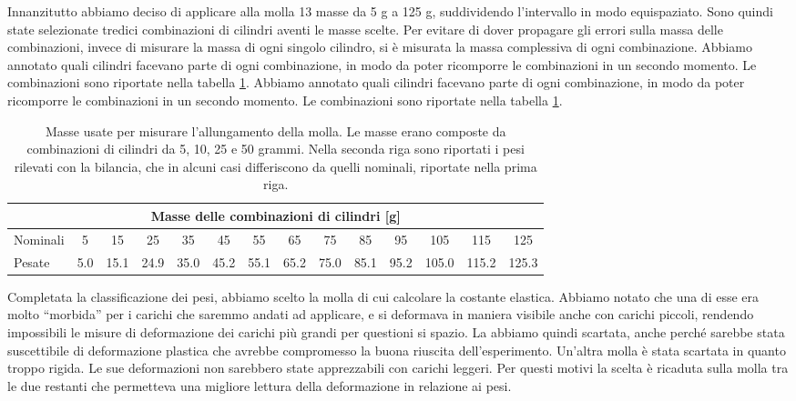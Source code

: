 Innanzitutto abbiamo deciso di applicare alla molla 13 masse da 5 g a 125 g, suddividendo l'intervallo in modo equispaziato.
Sono quindi state selezionate tredici combinazioni di cilindri aventi le masse scelte. Per evitare di dover propagare gli errori sulla massa delle combinazioni, invece di misurare la massa di ogni singolo cilindro, si è misurata la massa complessiva di ogni combinazione. Abbiamo annotato quali cilindri facevano parte di ogni combinazione, in modo da poter ricomporre le combinazioni in un secondo momento. Le combinazioni sono riportate nella tabella \ref{tab:masse}.
Abbiamo annotato quali cilindri facevano parte di ogni combinazione, in modo da poter ricomporre le combinazioni in un secondo momento. Le combinazioni sono riportate nella tabella \ref{tab:masse}.

\begin{table}[tb]
    \centering
    \small
    \begin{tabular}{l | c c c c c c c c c c c c c}
        \multicolumn{14}{c}{Masse delle combinazioni di cilindri [g]} \\[1mm]
        \toprule
        Nominali & 5 & 15 & 25 & 35 & 45 & 55 & 65 & 75 & 85 & 95 & 105 & 115 & 125 \\
        Pesate & 5.0 & 15.1 & 24.9 & 35.0 & 45.2 & 55.1 & 65.2 & 75.0 & 85.1 & 95.2 & 105.0 & 115.2 & 125.3 \\
        \bottomrule
    \end{tabular}
    \caption{Masse usate per misurare l'allungamento della molla. Le masse erano composte da combinazioni
    di cilindri da 5, 10, 25 e 50 grammi. Nella seconda riga sono riportati i pesi rilevati con
    la bilancia, che in alcuni casi differiscono da quelli nominali, riportate nella prima riga.}
    \label{tab:masse}
\end{table}

Completata la classificazione dei pesi, abbiamo scelto la molla di cui calcolare la
costante elastica. Abbiamo notato che una di esse era molto ``morbida'' per i carichi che saremmo
andati ad applicare, e si deformava in maniera visibile anche con carichi piccoli, rendendo impossibili
le misure di deformazione dei carichi più grandi per questioni si spazio.
La abbiamo quindi scartata, anche perché sarebbe stata suscettibile di deformazione
plastica che avrebbe compromesso la buona riuscita dell'esperimento.
Un'altra molla è stata scartata in quanto troppo rigida. Le sue deformazioni non sarebbero state
apprezzabili con carichi leggeri. Per questi motivi la scelta è ricaduta sulla molla tra 
le due restanti che permetteva una migliore lettura della deformazione in relazione ai pesi.

